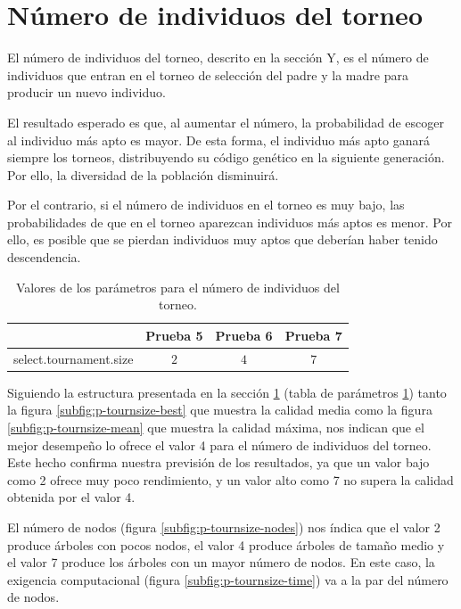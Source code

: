 %  
\section{Número de individuos del torneo}\label{sec:p-individuos-torneo}

El número de individuos del torneo, descrito en la sección Y, es el número de
individuos que entran en el torneo de selección del padre y la madre para
producir un nuevo individuo.

El resultado esperado es que, al aumentar el número, la probabilidad de escoger
al individuo más apto es mayor. De esta forma, el individuo más apto ganará
siempre los torneos, distribuyendo su código genético en la siguiente generación.
Por ello, la diversidad de la población disminuirá.

Por el contrario, si el número de individuos en el torneo es muy bajo, las
probabilidades de que en el torneo aparezcan individuos más aptos es menor. Por
ello, es posible que se pierdan individuos muy aptos que deberían haber tenido
descendencia.

\begin{table}[cbt]
\caption{Valores de los parámetros para el número de individuos del torneo.}
\label{tab:individuos-torneo}
\centering
\begin{tabular}{lccc}
\toprule
  &\textbf{Prueba 5} & \textbf{Prueba 6} & \textbf{Prueba 7}\\
\midrule
select.tournament.size &  $2$  & $4$ & $7$ \\
\bottomrule
\end{tabular}
\end{table}


Siguiendo la estructura presentada en la sección \ref{sec:p-individuos-torneo}
(tabla de parámetros \ref{tab:individuos-torneo}) tanto la figura
\ref{subfig:p-tournsize-best} que muestra la calidad media como la figura \ref{subfig:p-tournsize-mean} que muestra la calidad máxima, nos
indican que el mejor desempeño lo ofrece el valor 4 para el número de individuos
del torneo. Este hecho confirma nuestra previsión de los resultados, ya que un
valor bajo como 2 ofrece muy poco rendimiento, y un valor alto como 7 no supera
la calidad obtenida por el valor 4.

El número de nodos (figura \ref{subfig:p-tournsize-nodes}) nos índica que
el valor 2 produce árboles con pocos nodos, el valor 4 produce árboles de tamaño
medio y el valor 7 produce los árboles con un mayor número de nodos. En este
caso, la exigencia computacional (figura \ref{subfig:p-tournsize-time}) va a la
par del número de nodos.


